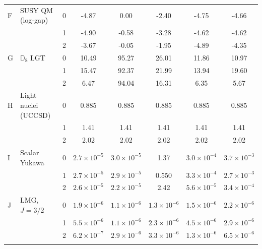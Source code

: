 \begin{longtable}{@{}llcccccc@{}}
F & SUSY QM (log-gap) & 0 & -4.87 & 0.00 & -2.40 & -4.75 & -4.66 \\
 &  & 1 & -4.90 & -0.58 & -3.28 & -4.62 & -4.62 \\
 &  & 2 & -3.67 & -0.05 & -1.95 & -4.89 & -4.35 \\
G & $\mathbb{D}_8$ LGT & 0 & 10.49 & 95.27 & 26.01 & 11.86 & 10.97 \\
 &  & 1 & 15.47 & 92.37 & 21.99 & 13.94 & 19.60 \\
 &  & 2 & 6.47 & 94.04 & 16.31 & 6.35 & 5.67 \\
H & Light nuclei (UCCSD) & 0 & 0.885 & 0.885 & 0.885 & 0.885 & 0.885 \\
 &  & 1 & 1.41 & 1.41 & 1.41 & 1.41 & 1.41 \\
 &  & 2 & 2.02 & 2.02 & 2.02 & 2.02 & 2.02 \\
I & Scalar Yukawa & 0 & $2.7\!\times\!10^{-5}$ & $3.0\!\times\!10^{-5}$ & 1.37 & $3.0\!\times\!10^{-4}$ & $3.7\!\times\!10^{-3}$ \\
 &  & 1 & $2.7\!\times\!10^{-5}$ & $2.9\!\times\!10^{-5}$ & 0.550 & $3.3\!\times\!10^{-4}$ & $2.7\!\times\!10^{-3}$ \\
 &  & 2 & $2.6\!\times\!10^{-5}$ & $2.2\!\times\!10^{-5}$ & 2.42 & $5.6\!\times\!10^{-5}$ & $3.4\!\times\!10^{-4}$ \\
J & LMG, $J{=}3/2$ & 0 & $1.9\!\times\!10^{-6}$ & $1.1\!\times\!10^{-6}$ & $1.3\!\times\!10^{-6}$ & $1.5\!\times\!10^{-6}$ & $2.2\!\times\!10^{-6}$ \\
 &  & 1 & $5.5\!\times\!10^{-6}$ & $1.1\!\times\!10^{-6}$ & $2.3\!\times\!10^{-6}$ & $4.5\!\times\!10^{-6}$ & $2.9\!\times\!10^{-6}$ \\
 &  & 2 & $6.2\!\times\!10^{-7}$ & $2.9\!\times\!10^{-6}$ & $3.3\!\times\!10^{-6}$ & $1.3\!\times\!10^{-6}$ & $6.5\!\times\!10^{-6}$ \\
\botrule
\end{longtable}
